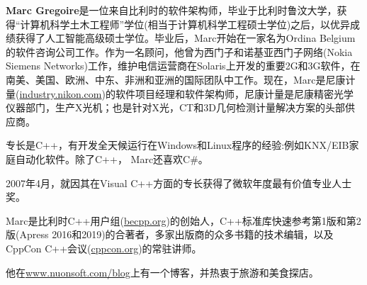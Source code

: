\textbf{Marc Gregoire}是一位来自比利时的软件架构师，毕业于比利时鲁汶大学，获得“计算机科学土木工程师”学位(相当于计算机科学工程硕士学位)之后，以优异成绩获得了人工智能高级硕士学位。毕业后，Marc开始在一家名为Ordina Belgium的软件咨询公司工作。作为一名顾问，他曾为西门子和诺基亚西门子网络(Nokia Siemens Networks)工作，维护电信运营商在Solaris上开发的重要2G和3G软件，在南美、美国、欧洲、中东、非洲和亚洲的国际团队中工作。现在，Marc是尼康计量(\url{industry.nikon.com})的软件项目经理和软件架构师，尼康计量是尼康精密光学仪器部门，生产X光机；也是针对X光，CT和3D几何检测计量解决方案的头部供应商。

专长是C++，有开发全天候运行在Windows和Linux程序的经验:例如KNX/EIB家庭自动化软件。除了C++， Marc还喜欢C\#。

2007年4月，就因其在Visual C++方面的专长获得了微软年度最有价值专业人士奖。

Marc是比利时C++用户组(\url{becpp.org})的创始人，C++标准库快速参考第1版和第2版(Apress 2016和2019)的合著者，多家出版商的众多书籍的技术编辑，以及CppCon C++会议(\url{cppcon.org})的常驻讲师。

他在\url{www.nuonsoft.com/blog}上有一个博客，并热衷于旅游和美食探店。